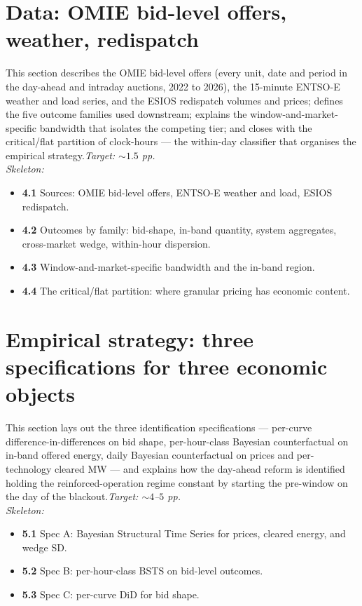 \documentclass[11pt]{article}
\begin{document}
\section{Data: OMIE bid-level offers, weather, redispatch}

This section describes the OMIE bid-level offers (every unit, date and period in the day-ahead and intraday auctions, 2022 to 2026), the 15-minute ENTSO-E weather and load series, and the ESIOS redispatch volumes and prices; defines the five outcome families used downstream; explains the window-and-market-specific bandwidth that isolates the competing tier; and closes with the critical/flat partition of clock-hours --- the within-day classifier that organises the empirical strategy.\hfill\emph{Target: $\sim 1.5$ pp.}
\\\emph{Skeleton:}
\begin{itemize}
  \item \textbf{4.1} Sources: OMIE bid-level offers, ENTSO-E weather and load, ESIOS redispatch.
  \item \textbf{4.2} Outcomes by family: bid-shape, in-band quantity, system aggregates, cross-market wedge, within-hour dispersion.
  \item \textbf{4.3} Window-and-market-specific bandwidth and the in-band region.
  \item \textbf{4.4} The critical/flat partition: where granular pricing has economic content.
\end{itemize}

\section{Empirical strategy: three specifications for three economic objects}

This section lays out the three identification specifications --- per-curve difference-in-differences on bid shape, per-hour-class Bayesian counterfactual on in-band offered energy, daily Bayesian counterfactual on prices and per-technology cleared MW --- and explains how the day-ahead reform is identified holding the reinforced-operation regime constant by starting the pre-window on the day of the blackout.\hfill\emph{Target: $\sim 4$--$5$ pp.}
\\\emph{Skeleton:}
\begin{itemize}
  \item \textbf{5.1} Spec A: Bayesian Structural Time Series for prices, cleared energy, and wedge SD.
  \item \textbf{5.2} Spec B: per-hour-class BSTS on bid-level outcomes.
  \item \textbf{5.3} Spec C: per-curve DiD for bid shape.
\end{itemize}
\end{document}
